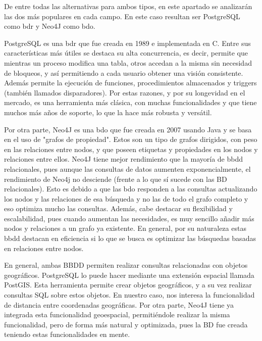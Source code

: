     De entre todas las alternativas para ambos tipos, en este apartado se analizarán las dos más populares en cada campo. En este caso resultan ser PostgreSQL\cite{postgres} como \ac{bdr} y Neo4J\cite{neo4j} como \ac{bdo}.
    
    PostgreSQL es una \ac{bdr} que fue creada en 1989 e implementada en C. Entre sus características más útiles se destaca su alta concurrencia, es decir, permite que mientras un proceso modifica una tabla, otros accedan a la misma sin necesidad de bloqueos, y así permitiendo a cada usuario obtener una visión consistente. Además permite la ejecución de funciones, procedimientos almacenados y triggers (también llamados disparadores).
    Por estas razones, y por su longevidad en el mercado, es una herramienta más clásica, con muchas funcionalidades y que tiene muchos más años de soporte, lo que la hace más robusta y versátil.
    
    Por otra parte, Neo4J es una \ac{bdo} que fue creada en 2007 usando Java y se basa en el uso de "grafos de propiedad". Estos son un tipo de grafos dirigidos, con peso en las relaciones entre nodos, y que poseen etiquetas y propiedades en los nodos y relaciones entre ellos. Neo4J tiene mejor rendimiento que la mayoría de \ac{bbdd} relacionales, pues aunque las consultas de datos aumenten exponencialmente, el rendimiento de Neo4j no desciende (frente a lo que sí sucede con las BD relacionales). Esto es debido a que las \ac{bdo} responden a las consultas actualizando los nodos y las relaciones de esa búsqueda y no las de todo el grafo completo y eso optimiza mucho las consultas.
    Además, cabe destacar su flexibilidad y escalabilidad, pues cuando aumentan las necesidades, es muy sencillo añadir más nodos y relaciones a un grafo ya existente.
    En general, por su naturaleza estas \ac{bbdd} destacan en eficiencia si lo que se busca es optimizar las búsquedas basadas en relaciones entre nodos. 
    
    En general, ambas BBDD permiten realizar consultas relacionadas con objetos geográficos.
    PostgreSQL lo puede hacer mediante una extensión espacial llamada PostGIS\cite{postgis}. Esta herramienta permite crear objetos geográficos, y a su vez realizar consultas SQL sobre estos objetos. En nuestro caso, nos interesa la funcionalidad de distancia entre coordenadas geográficas.
    Por otra parte, Neo4J tiene ya integrada esta funcionalidad geoespacial, permitiéndole realizar la misma funcionalidad, pero de forma más natural y optimizada, pues la BD fue creada teniendo estas funcionalidades en mente.
    
